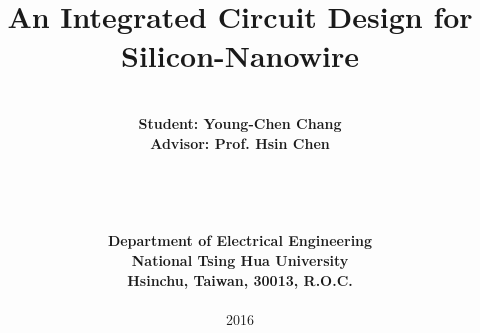 \documentclass[a4paper,12pt,oneside,titlepage, fleqn]{book}
\begin{document}
\graphicspath{{images/}}



\title{\bf \Huge An Integrated Circuit Design for Silicon-Nanowire}
\date{}
\author{
\begin{tabular}{c}
\\
\\
{\LARGE \bf Student: Young-Chen Chang}\\
{\LARGE \bf Advisor: Prof. Hsin Chen}\\
\\
\\
\\
\\
{\LARGE \bf Department of Electrical Engineering}\\
{\LARGE \bf National Tsing Hua University}\\
{\LARGE \bf Hsinchu, Taiwan, 30013, R.O.C.}\\
\\
{\large  2016}
\end{tabular}
}

\maketitle

\frontmatter
{}


\setcounter{tocdepth}{4}
\setcounter{secnumdepth}{4}
\tableofcontents
\listoffigures

\mainmatter
{}







\backmatter

{


}



\end{document}
